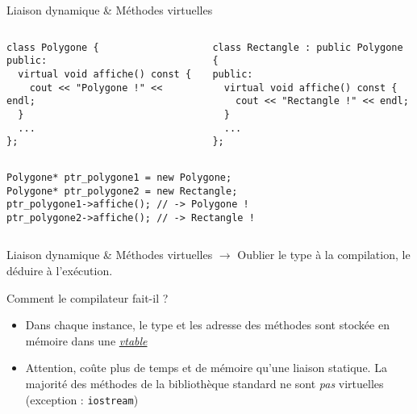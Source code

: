 \documentclass[c]{beamer}
\begin{document}
\begin{frame}[fragile]{Liaison dynamique \& Méthodes virtuelles}
\begin{columns}
\begin{column}{0.5\columnwidth}
\begin{verbatim}
class Polygone {
public:
  virtual void affiche() const {
    cout << "Polygone !" << endl;
  }
  ...
};
\end{verbatim}
\end{column}
\begin{column}{0.5\columnwidth}
\begin{verbatim}
class Rectangle : public Polygone {
public:
  virtual void affiche() const {
    cout << "Rectangle !" << endl;
  }
  ...
};
\end{verbatim}
\end{column}
\end{columns}

\vspace{1em}

\begin{columns}
\begin{column}{0.5\columnwidth}
\begin{verbatim}
Polygone* ptr_polygone1 = new Polygone;
Polygone* ptr_polygone2 = new Rectangle;
ptr_polygone1->affiche(); // -> Polygone !
ptr_polygone2->affiche(); // -> Rectangle !
\end{verbatim}
\end{column}
\end{columns}
\begin{center}
\end{center}
\end{frame}


\begin{frame}[fragile]{Liaison dynamique \& Méthodes virtuelles}
$\rightarrow$ Oublier le type à la compilation, le déduire à l'exécution.
\vspace{1em}

Comment le compilateur fait-il ?
\begin{itemize}
  \item Dans chaque instance, le type et les adresse des méthodes sont stockée en mémoire dans une \href{https://en.wikipedia.org/wiki/Virtual_method_table}{\emph{vtable}}
  \item Attention, coûte plus de temps et de mémoire qu'une liaison statique. {\footnotesize La majorité des méthodes de la bibliothèque standard ne sont \emph{pas} virtuelles (exception : \texttt{iostream})}
\end{itemize}
\end{frame}
\end{document}
